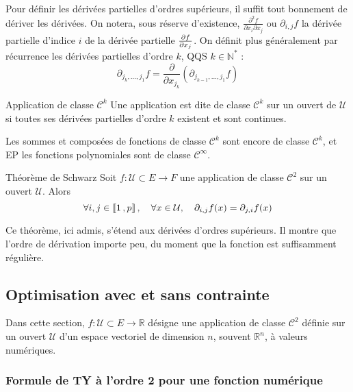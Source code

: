     Pour définir les dérivées partielles d’ordres supérieurs, il suffit tout bonnement de dériver les dérivées. On notera, sous réserve d’existence, $\frac{\partial^2 f}{\partial x_i \partial x_j}$ ou $\partial_{i,j} f$ la dérivée partielle d’indice $i$ de la dérivée partielle $\frac{\partial f}{\partial x_j}$. On définit plus généralement par récurrence les dérivées partielles d’ordre $k$, QQS $k \in \mathbb{N}^*$ :
    \[ \partial_{j_k, \ldots, j_1} f = \frac{\partial}{\partial x_{j_k}} \left( \partial_{j_{k-1}, \ldots, j_1} f \right) \]   

    \begin{defi}{Application de classe $\mathcal{C}^k$}{}
        Une application est dite de classe $\mathcal{C}^k$ sur un ouvert de $\mathcal{U}$ si toutes ses dérivées partielles d’ordre $k$ existent et sont continues. 
    \end{defi}

    Les sommes et composées de fonctions de classe $\mathcal{C}^k$ sont encore de classe $\mathcal{C}^k$, et EP les fonctions polynomiales sont de classe $\mathcal{C}^{\infty}$. 

    \begin{theo}{Théorème de Schwarz}{}
        Soit $f : \mathcal{U} \subset E \to F$ une application de classe $\mathcal{C}^2$ sur un ouvert $\mathcal{U}$. Alors 
        \[ \forall i,j \in \left\llbracket 1 \, , p \right\rrbracket, \quad \forall x \in \mathcal{U}, \quad \partial_{i,j} f(x) = \partial_{j,i} f (x) \]   
    \end{theo}

    Ce théorème, ici admis, s’étend aux dérivées d’ordres supérieurs. Il montre que l’ordre de dérivation importe peu, du moment que la fonction est suffisamment régulière. 

\subsection{Optimisation avec et sans contrainte}

    Dans cette section, $f : \mathcal{U} \subset E \to \mathbb{R}$ désigne une application de classe $\mathcal{C}^2$ définie sur un ouvert $\mathcal{U}$ d’un espace vectoriel de dimension $n$, souvent $\mathbb{R}^n$, à valeurs numériques.

    \subsubsection{Formule de TY à l’ordre 2 pour une fonction numérique}


